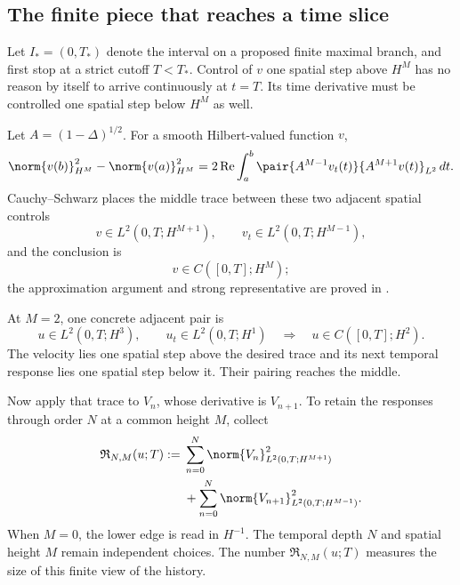 \subsection{The finite piece that reaches a time slice}\label{sub:BodyFiniteAdjacentRectangles}

Let \(I_*=(0,T_*)\) denote the interval on a proposed finite maximal branch,
and first stop at a strict cutoff \(T<T_*\).  Control of \(v\) one spatial
step above \(H^M\) has no reason by itself to arrive continuously at \(t=T\).
Its time derivative must be controlled one spatial step below \(H^M\) as well.

Let \(A=(1-\Delta)^{1/2}\).  For a smooth Hilbert-valued function \(v\),
\begin{equation}\label{eq:BodyAdjacentTraceIdentity}
  \norm{v(b)}_{H^M}^2-
  \norm{v(a)}_{H^M}^2
  =2\operatorname{Re}\int_a^b
  \pair{A^{M-1}v_t(t)}{A^{M+1}v(t)}_{L^2}\,dt.
\end{equation}
Cauchy--Schwarz places the middle trace between these two adjacent spatial
controls
\begin{equation}\label{eq:BodyAdjacentTracePair}
  v\in L^2(0,T;H^{M+1}),
  \qquad
  v_t\in L^2(0,T;H^{M-1}),
\end{equation}
and the conclusion is
\begin{equation}\label{eq:BodyAdjacentTraceConclusion}
  v\in C([0,T];H^M);
\end{equation}
the approximation argument and strong representative are proved in
.

At \(M=2\), one concrete adjacent pair is
\begin{equation}\label{eq:FirstConcreteAdjacentPair}
  u\in L^2(0,T;H^3),
  \qquad
  u_t\in L^2(0,T;H^1)
  \quad\Longrightarrow\quad
  u\in C([0,T];H^2).
\end{equation}
The velocity lies one spatial step above the desired trace and its next
temporal response lies one spatial step below it.  Their pairing reaches the
middle.

Now apply that trace to \(V_n\), whose derivative is \(V_{n+1}\).  To retain
the responses through order \(N\) at a common height \(M\), collect
\begin{equation}\label{eq:BodyRectangleNorm}
\begin{aligned}
  \mathfrak R_{N,M}(u;T)
  :={}&
  \sum_{n=0}^{N}
  \norm{V_n}_{L^2(0,T;H^{M+1})}^2
  \\
  &+
  \sum_{n=0}^{N}
  \norm{V_{n+1}}_{L^2(0,T;H^{M-1})}^2.
\end{aligned}
\end{equation}
When \(M=0\), the lower edge is read in \(H^{-1}\).  The temporal depth
\(N\) and spatial height \(M\) remain independent choices.
The number \(\mathfrak R_{N,M}(u;T)\) measures the size of this finite view of
the history.

